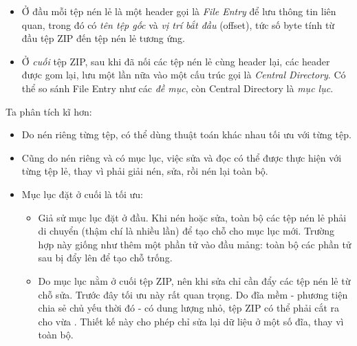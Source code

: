 \documentclass[../../thesis]{subfiles}
\begin{document}
\begin{itemize}[resume, before = \vspace*{-\dimexpr\topsep+\partopsep\relax}]
    \item
        Ở đầu mỗi tệp nén lẻ là một header gọi là \emph{File Entry} để lưu thông
        tin liên quan, trong đó có \emph{tên tệp gốc} và \emph{vị trí bắt đầu}
        (offset), tức số byte tính từ đầu tệp ZIP đến tệp nén lẻ tương ứng.
    \item
        Ở \emph{cuối} tệp ZIP, sau khi đã nối các tệp nén lẻ cùng header lại,
        các header được gom lại, lưu một lần nữa vào một cấu trúc gọi là
        \emph{Central Directory}. Có thể so sánh File Entry như các \emph{đề
        mục}, còn Central Directory là \emph{mục lục}.
\end{itemize}

Ta phân tích kĩ hơn:

\begin{itemize}
    \item
        Do nén riêng từng tệp, có thể dùng thuật toán khác nhau tối ưu với từng
        tệp.
    \item
        Cũng do nén riêng và có mục lục, việc sửa và đọc có thể được thực hiện
        với từng tệp lẻ, thay vì phải giải nén, sửa, rồi nén lại toàn bộ.
\end{itemize}

\begin{itemize}[resume, before = \vspace*{-\dimexpr\topsep+\partopsep\relax}]
    \item
        Mục lục đặt ở cuối là tối ưu:

        \begin{itemize}
            \item
                Giả sử mục lục đặt ở đầu. Khi nén hoặc sửa, toàn bộ các tệp nén
                lẻ phải di chuyển (thậm chí là nhiều lần) để tạo chỗ cho mục lục
                mới. Trường hợp này giống như thêm một phần tử vào đầu mảng:
                toàn bộ các phần tử sau bị đẩy lên để tạo chỗ trống.
            \item
                Do mục lục nằm ở cuối tệp ZIP, nên khi sửa chỉ cần đẩy các tệp
                nén lẻ từ chỗ sửa. Trước đây tối ưu này rất quan trọng. Do đĩa
                mềm - phương tiện chia sẻ chủ yếu thời đó - có dung lượng nhỏ,
                tệp ZIP có thể phải cắt ra cho vừa \cite{WIKI_ZIP}. Thiết kế này
                cho phép chỉ sửa lại dữ liệu ở một số đĩa, thay vì toàn bộ.
        \end{itemize}
\end{itemize}
\end{document}
